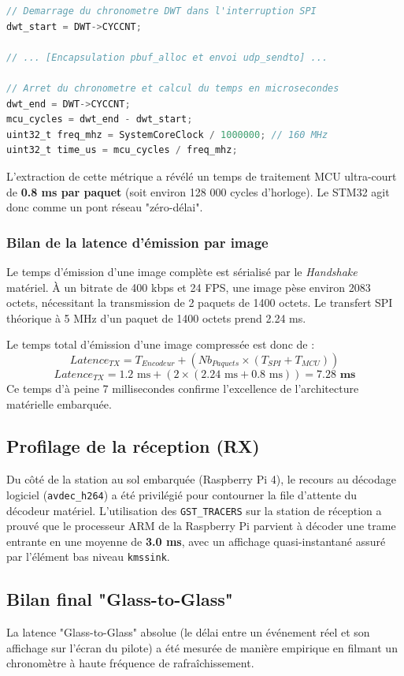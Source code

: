 \begin{lstlisting}[language=C]
// Demarrage du chronometre DWT dans l'interruption SPI
dwt_start = DWT->CYCCNT;

// ... [Encapsulation pbuf_alloc et envoi udp_sendto] ...

// Arret du chronometre et calcul du temps en microsecondes
dwt_end = DWT->CYCCNT;
mcu_cycles = dwt_end - dwt_start;
uint32_t freq_mhz = SystemCoreClock / 1000000; // 160 MHz
uint32_t time_us = mcu_cycles / freq_mhz;
\end{lstlisting}

L'extraction de cette métrique a révélé un temps de traitement MCU ultra-court de \textbf{0.8 ms par paquet} 
(soit environ 128 000 cycles d'horloge). Le STM32 agit donc comme un pont réseau "zéro-délai".

\subsubsection{Bilan de la latence d'émission par image}
Le temps d'émission d'une image complète est sérialisé par le \textit{Handshake} matériel. À un bitrate de 
400 kbps et 24 FPS, une image pèse environ 2083 octets, nécessitant la transmission de 2 paquets de 1400 octets. 
Le transfert SPI théorique à 5 MHz d'un paquet de 1400 octets prend 2.24 ms.

Le temps total d'émission d'une image compressée est donc de :
$$Latence_{TX} = T_{Encodeur} + \left( Nb_{Paquets} \times (T_{SPI} + T_{MCU}) \right)$$
$$Latence_{TX} = 1.2\text{ ms} + \left( 2 \times (2.24\text{ ms} + 0.8\text{ ms}) \right) = \mathbf{7.28\text{ ms}}$$
Ce temps d'à peine 7 millisecondes confirme l'excellence de l'architecture matérielle embarquée.

\subsection{Profilage de la réception (RX)}
Du côté de la station au sol embarquée (Raspberry Pi 4), le recours au décodage logiciel (\texttt{avdec\_h264}) 
a été privilégié pour contourner la file d'attente du décodeur matériel.
L'utilisation des \texttt{GST\_TRACERS} sur la station de réception a prouvé que le processeur ARM de la 
Raspberry Pi parvient à décoder une trame entrante en une moyenne de \textbf{3.0 ms}, avec un affichage 
quasi-instantané assuré par l'élément bas niveau \texttt{kmssink}.

\subsection{Bilan final "Glass-to-Glass"}
La latence "Glass-to-Glass" absolue (le délai entre un événement réel et son affichage sur l'écran du pilote) 
a été mesurée de manière empirique en filmant un chronomètre à haute fréquence de rafraîchissement.

